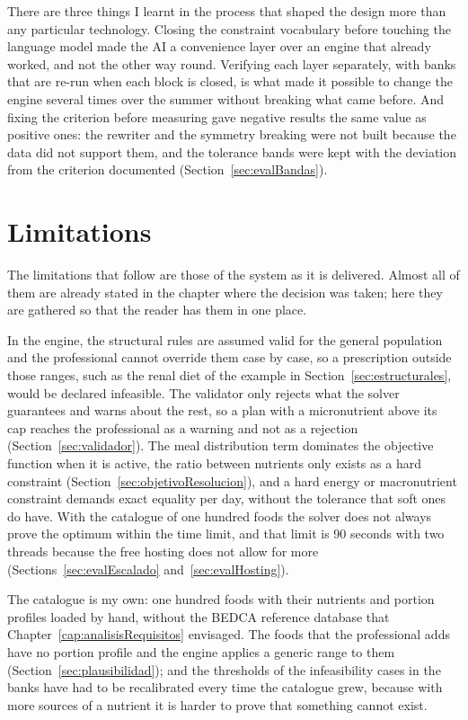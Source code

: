 There are three things I learnt in the process that shaped the design more than any particular technology. Closing the constraint vocabulary before touching the language model made the AI a convenience layer over an engine that already worked, and not the other way round. Verifying each layer separately, with banks that are re-run when each block is closed, is what made it possible to change the engine several times over the summer without breaking what came before. And fixing the criterion before measuring gave negative results the same value as positive ones: the rewriter and the symmetry breaking were not built because the data did not support them, and the tolerance bands were kept with the deviation from the criterion documented (Section~\ref{sec:evalBandas}).

\section*{Limitations}
\label{sec:limitations}

The limitations that follow are those of the system as it is delivered. Almost all of them are already stated in the chapter where the decision was taken; here they are gathered so that the reader has them in one place.

In the engine, the structural rules are assumed valid for the general population and the professional cannot override them case by case, so a prescription outside those ranges, such as the renal diet of the example in Section~\ref{sec:estructurales}, would be declared infeasible. The validator only rejects what the solver guarantees and warns about the rest, so a plan with a micronutrient above its cap reaches the professional as a warning and not as a rejection (Section~\ref{sec:validador}). The meal distribution term dominates the objective function when it is active, the ratio between nutrients only exists as a hard constraint (Section~\ref{sec:objetivoResolucion}), and a hard energy or macronutrient constraint demands exact equality per day, without the tolerance that soft ones do have. With the catalogue of one hundred foods the solver does not always prove the optimum within the time limit, and that limit is 90 seconds with two threads because the free hosting does not allow for more (Sections~\ref{sec:evalEscalado} and~\ref{sec:evalHosting}).

The catalogue is my own: one hundred foods with their nutrients and portion profiles loaded by hand, without the BEDCA reference database that Chapter~\ref{cap:analisisRequisitos} envisaged. The foods that the professional adds have no portion profile and the engine applies a generic range to them (Section~\ref{sec:plausibilidad}); and the thresholds of the infeasibility cases in the banks have had to be recalibrated every time the catalogue grew, because with more sources of a nutrient it is harder to prove that something cannot exist.


